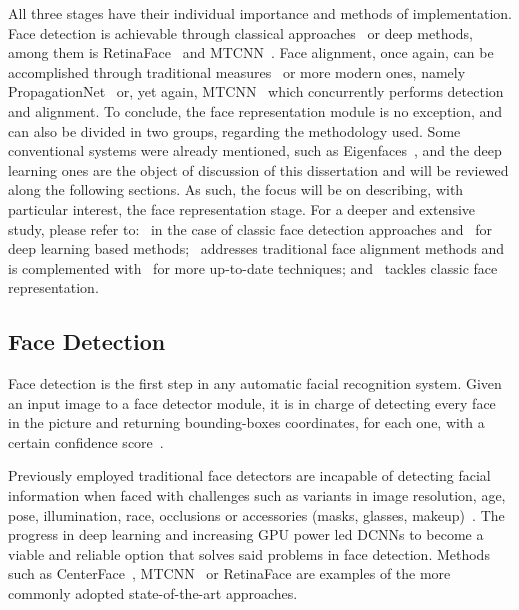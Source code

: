 \documentclass[class=report, crop=false, a4paper, 12pt]{standalone}
\begin{document}
\par All three stages have their individual importance and methods of implementation. Face detection is achievable through classical approaches~\autocite{violaRapidObjectDetection2001, brubakerDesignCascadesBoosted2008} or deep methods, among them is RetinaFace~\autocite{dengRetinaFaceSinglestageDense2019} and MTCNN~\autocite{zhangJointFaceDetection2016a}. Face alignment, once again, can be accomplished through traditional measures~\autocite{cootesViewbasedActiveAppearance2002, martinezLocalEvidenceAggregation2013} or more modern ones, namely PropagationNet~\autocite{huangPropagationNetPropagatePoints2020} or, yet again, MTCNN~\autocite{zhangJointFaceDetection2016a} which concurrently performs detection and alignment. To conclude, the face representation module is no exception, and can also be divided in two groups, regarding the methodology used. Some conventional systems were already mentioned, such as Eigenfaces~\autocite{p.n.belhumeurEigenfacesVsFisherfaces1997,turkEigenfacesRecognition1991}, and the deep learning ones are the object of discussion of this dissertation and will be reviewed along the following sections. As such, the focus will be on describing, with particular interest, the face representation stage. For a deeper and extensive study, please refer to:~\autocite{zafeiriouSurveyFaceDetection2015} in the case of classic face detection approaches and~\autocite{minaeeGoingDeeperFace2021} for deep learning based methods;~\autocite{wangFacialFeaturePoint2018} addresses traditional face alignment methods and is complemented with~\autocite{duElementsEndtoendDeep2022} for more up-to-date techniques; and~\autocite{learned-millerLabeledFacesWild2016} tackles classic face representation.

\subsection{Face Detection}
\par Face detection is the first step in any automatic facial recognition system. Given an input image to a face detector module, it is in charge of detecting every face in the picture and returning bounding-boxes coordinates, for each one, with a certain confidence score~\autocite{duElementsEndtoendDeep2022,ranjanDeepLearningUnderstanding2018}.

\par Previously employed traditional face detectors are incapable of detecting facial information when faced with challenges such as variants in image resolution, age, pose, illumination, race, occlusions or accessories (masks, glasses, makeup)~\autocite{duElementsEndtoendDeep2022,ranjanDeepLearningUnderstanding2018}. The progress in deep learning and increasing GPU power led \gls{DCNNs} to become a viable and reliable option that solves said problems in face detection. Methods such as CenterFace~\autocite{xuCenterFaceJointFace2019}, MTCNN~\autocite{zhangJointFaceDetection2016a} or RetinaFace\autocite{dengRetinaFaceSinglestageDense2019} are examples of the more commonly adopted state-of-the-art approaches.
\end{document}
